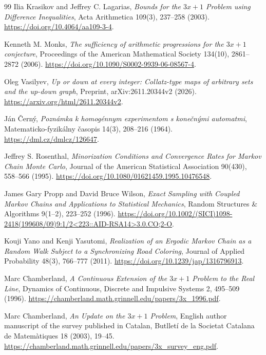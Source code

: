 \begin{thebibliography}{99}
Ilia Krasikov and Jeffrey C. Lagarias,
\emph{Bounds for the $3x+1$ Problem using Difference Inequalities},
Acta Arithmetica 109(3), 237--258 (2003).
\url{https://doi.org/10.4064/aa109-3-4}.

Kenneth M. Monks,
\emph{The sufficiency of arithmetic progressions for the $3x+1$ conjecture},
Proceedings of the American Mathematical Society 134(10), 2861--2872 (2006).
\url{https://doi.org/10.1090/S0002-9939-06-08567-4}.

Oleg Vasilyev,
\emph{Up or down at every integer: Collatz-type maps of arbitrary sets and the up-down graph},
Preprint, arXiv:2611.20344v2 (2026).
\url{https://arxiv.org/html/2611.20344v2}.

J\'{a}n \v{C}ern\'{y},
\emph{Pozn\'{a}mka k homog\'{e}nnym experimentom s kone\v{c}n\'{y}mi automatmi},
Matematicko-fyzik\'{a}lny \v{c}asopis 14(3), 208--216 (1964).
\url{https://dml.cz/dmlcz/126647}.

Jeffrey S. Rosenthal,
\emph{Minorization Conditions and Convergence Rates for Markov Chain Monte Carlo},
Journal of the American Statistical Association 90(430), 558--566 (1995).
\url{https://doi.org/10.1080/01621459.1995.10476548}.

James Gary Propp and David Bruce Wilson,
\emph{Exact Sampling with Coupled Markov Chains and Applications to Statistical Mechanics},
Random Structures \& Algorithms 9(1--2), 223--252 (1996).
\url{https://doi.org/10.1002/(SICI)1098-2418(199608/09)9:1/2<223::AID-RSA14>3.0.CO;2-O}.

Kouji Yano and Kenji Yasutomi,
\emph{Realization of an Ergodic Markov Chain as a Random Walk Subject to a Synchronizing Road Coloring},
Journal of Applied Probability 48(3), 766--777 (2011).
\url{https://doi.org/10.1239/jap/1316796913}.

Marc Chamberland,
\emph{A Continuous Extension of the $3x+1$ Problem to the Real Line},
Dynamics of Continuous, Discrete and Impulsive Systems 2, 495--509 (1996).
\url{https://chamberland.math.grinnell.edu/papers/3x_1996.pdf}.

Marc Chamberland,
\emph{An Update on the $3x+1$ Problem},
English author manuscript of the survey published in Catalan, Butllet\'{i} de la Societat Catalana de Matem\`{a}tiques 18 (2003), 19--45.
\url{https://chamberland.math.grinnell.edu/papers/3x_survey_eng.pdf}.


\end{thebibliography}
